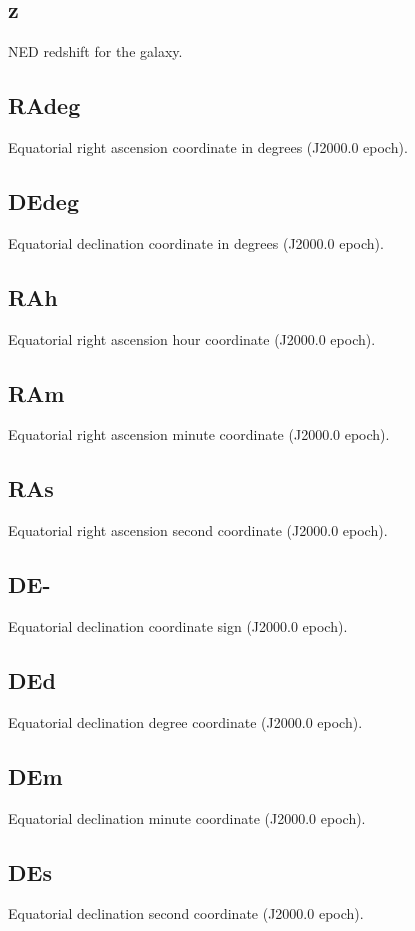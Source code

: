 \documentclass[iop]{emulateapj-rtx4}
\begin{document}
\subsection{z}
NED redshift for the galaxy. 

\subsection{RAdeg}
Equatorial right ascension coordinate in degrees (J2000.0 epoch).

\subsection{DEdeg}
Equatorial declination coordinate in degrees (J2000.0 epoch).

\subsection{RAh}
Equatorial right ascension hour coordinate (J2000.0 epoch).

\subsection{RAm}
Equatorial right ascension minute coordinate (J2000.0 epoch).

\subsection{RAs}
Equatorial right ascension second coordinate (J2000.0 epoch).

\subsection{DE-}
Equatorial declination coordinate sign (J2000.0 epoch).

\subsection{DEd}
Equatorial declination degree coordinate (J2000.0 epoch).

\subsection{DEm}
Equatorial declination minute coordinate (J2000.0 epoch).

\subsection{DEs}
Equatorial declination second coordinate (J2000.0 epoch).
\end{document}
